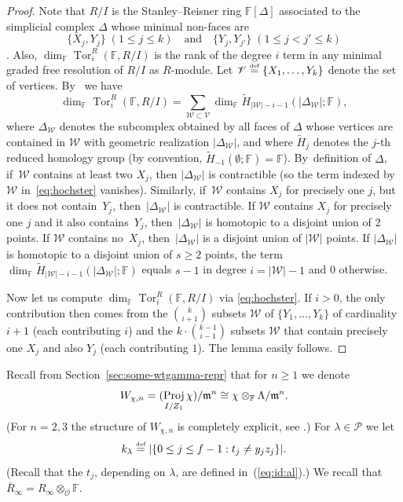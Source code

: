 \documentclass[JEP,XML,SOM,Unicode,NoFloatCountersInSection, NoEqCountersInSection,published]{cedram}
\newcommand{\quand}{\quad\text{and}\quad}
\let\wt\widetilde
\newcommand{\defeq}{\stackrel{\textrm{\tiny{\upshape{def}}}}{=}}
\newcommand{\F}{\mathbb{F}}
\newcommand{\cO}{\mathcal{O}}
\renewcommand{\P}{\mathscr P}
\DeclareMathOperator{\Proj}{Proj}
\DeclareMathOperator{\Tor}{Tor}
\theoremstyle{plain}
\theoremstyle{definition}
\begin{document}
\begin{proof}
Note that $R/I$ is the Stanley--Reisner ring $\F[\Delta]$ associated to the simplicial complex $\Delta$ whose minimal non-faces are\vspace*{-3pt}
\[
\{X_j, Y_j\}\; (1 \le j \le k) \quand\{Y_j, Y_{j'}\}\; (1 \le j < j' \le k)
\]
\cite[\S 5]{BH93}.
Also, $\dim_\F \Tor_i^R(\F,R/I)$ is the rank of the degree $i$ term in any minimal graded free resolution of $R/I$ as $R$-module.
Let $\mathscr V \defeq \{X_1,\dots,Y_k\}$ denote the set of vertices. By~\cite[Th.\,5.5.1, Thm.\ 5.3.2]{BH93} we have\vspace*{-3pt}
\begin{equation}\label{eq:hochster}
\dim_\F \Tor_i^R(\F,R/I) = \sum_{\mathscr W \subset \mathscr V} \dim_\F \wt H_{|\mathscr W|-i-1}(|\Delta_{\mathscr W}|;\F),
\end{equation}
where $\Delta_{\mathscr W}$ denotes the subcomplex obtained by all faces of $\Delta$ whose vertices are contained in $\mathscr W$ with geometric realization $|\Delta_{\mathscr W}|$, and where $\wt H_j$ denotes the $j$-th reduced homology group (by convention, $\wt H_{-1}(\emptyset;\F) = \F$). By~definition of $\Delta$, if~$\mathscr W$ contains at least two $X_j$, then $|\Delta_{\mathscr W}|$ is contractible (so the term indexed by $\mathscr W$ in~\eqref{eq:hochster} vanishes).
Similarly, if~$\mathscr W$ contains $X_j$ for precisely one $j$, but it does not contain~$Y_j$, then~$|\Delta_{\mathscr W}|$ is contractible.
If $\mathscr W$ contains $X_j$ for precisely one $j$ and it also contains~$Y_j$, then~$|\Delta_{\mathscr W}|$ is homotopic to a disjoint union of 2 points.
If $\mathscr W$ contains no~$X_j$, then~$|\Delta_{\mathscr W}|$ is a disjoint union of $|\mathscr W|$ points.
If $|\Delta_{\mathscr W}|$ is homotopic to a disjoint union of $s \ge 2$ points, the term $\dim_\F \wt H_{|\mathscr W|-i-1}(|\Delta_{\mathscr W}|;\F)$ equals $s-1$ in degree $i = |\mathscr W|-1$ and 0 otherwise.

Now let us compute $\dim_{\F}\Tor_i^R(\F,R/I)$ via \eqref{eq:hochster}. If $i > 0$, the only contribution then comes from the $\binom k{i+1}$ subsets $\mathscr W$ of $\{Y_1,\dots,Y_k\}$ of cardinality $i+1$ (each contributing $i$) and the $k\cdot \binom {k-1}{i-1}$ subsets $\mathscr W$ that contain precisely one $X_j$ and also $Y_j$ (each contributing $1$).
The lemma easily follows.
\end{proof}

Recall from Section~\ref{sec:some-wtgamma-repr} that for $n \ge 1$ we denote\vspace*{-3pt}
\[
W_{\chi,n} = (\Proj_{I/Z_1} \chi)/\m^n \cong \chi \otimes_\F \Lambda/\m^n.
\]
(For $n=2,3$ the structure of $W_{\chi,n}$ is completely explicit, see \cite[\S 3.1]{HuWang2}.)
For $\lambda \in \P$ we let\vspace*{-3pt}
\begin{equation*}
k_\lambda \defeq |\{0 \le j \le f-1: t_j \ne y_jz_j \}|.
\end{equation*}
(Recall that the $t_j$, depending on $\lambda$, are defined in~(\ref{eq:id:al}).)
We recall that \hbox{$\overline{R}_{\infty}\!=\!R_{\infty}{\otimes_{\cO}}\F$}.
\end{document}
